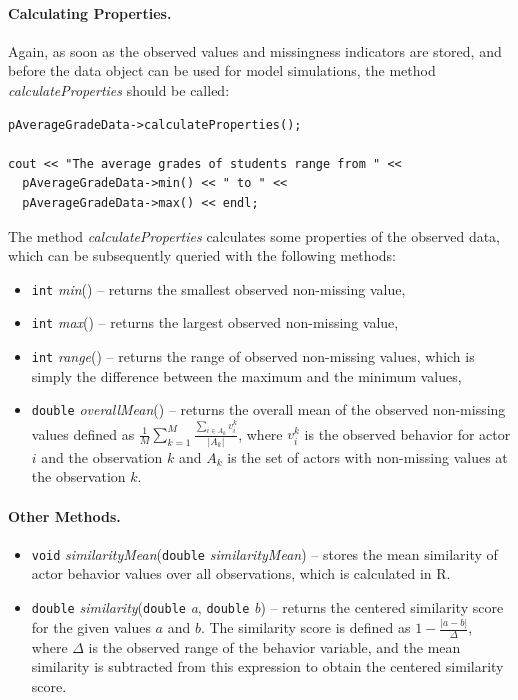 \documentclass[12pt]{article}
\renewcommand{\=}{\,=\,}
\newcommand{\+}{\,+\,}
\newcommand{\nnm}[1]{\textsf{\small\textit{#1}}}
\begin{document}
\paragraph{Calculating Properties.} 
Again, as soon as the observed values and missingness indicators are stored, and
before the data object can be used for model simulations, the method
\nnm{calculateProperties} should be called:
\begin{verbatim}
pAverageGradeData->calculateProperties();

cout << "The average grades of students range from " <<
  pAverageGradeData->min() << " to " <<
  pAverageGradeData->max() << endl;
\end{verbatim}
The method \nnm{calculateProperties} calculates some properties of the
observed data, which can be subsequently queried with the following methods:
\begin{itemize}
\item \verb|int| \nnm{min}() -- returns the smallest observed non-missing value,
\item \verb|int| \nnm{max}() -- returns the largest observed non-missing value,
\item \verb|int| \nnm{range}() -- returns the range of observed non-missing
values, which is simply the difference between the maximum and the minimum
values,
\item \verb|double| \nnm{overallMean}() -- returns the overall mean of the
observed non-missing values defined as
$\frac{1}{M}\sum_{k=1}^{M} \frac{\sum_{i \in A_k} v_i^k}{|A_k|}$, where $v_i^k$
is the observed behavior for actor $i$ and the observation $k$ and $A_k$ is the
set of actors with non-missing values at the observation $k$.
\end{itemize}

\paragraph{Other Methods.}
\begin{itemize}
\item \verb|void| \nnm{similarityMean}(\verb|double| \nnm{similarityMean}) --
stores the mean similarity of actor behavior values over all
observations, which is calculated in R.
\item \verb|double| \nnm{similarity}(\verb|double| \nnm{a},
\verb|double| \nnm{b}) -- returns the centered similarity score for the given
values $a$ and $b$. The similarity score is defined as
$1 - \frac{|a-b|}{\Delta}$, where $\Delta$ is the observed range of the
behavior variable, and the mean similarity is subtracted from this expression to
obtain the centered similarity score.
\end{itemize}
\end{document}
